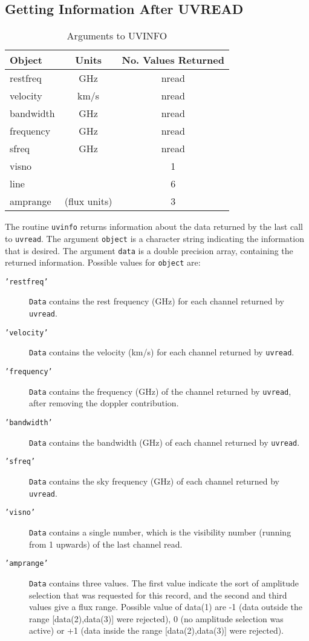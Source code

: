 \documentclass{report}
\begin{document}
\subsection{Getting Information After UVREAD}
\begin{table}\centering
\begin{tabular}{|l|c|c|}				    \hline
\bf Object	& \bf Units	& \bf No. Values Returned\\ \hline
restfreq	& GHz		& nread \\
velocity	& km/s		& nread \\
bandwidth	& GHz		& nread \\
frequency	& GHz		& nread \\
sfreq		& GHz		& nread \\
visno		&		& 1\\
line		&		& 6\\
amprange	& (flux units)	& 3\\			    \hline
\end{tabular}
\caption{Arguments to UVINFO}
\label{t:uvinfo}
\end{table}
The routine {\tt uvinfo} returns information about the data returned by
the last call to {\tt uvread}. The argument {\tt object} is a character
string indicating the information that is desired. The argument {\tt data}
is a double precision array, containing the returned information.
Possible values for {\tt object} are:
\begin{description}
\item[\texttt{'restfreq'}] {\tt Data} contains the rest frequency (GHz) for
each channel returned by {\tt uvread}.
\item[\texttt{'velocity'}] {\tt Data} contains the velocity (km/s) for each
channel returned by {\tt uvread}.
\item[\texttt{'frequency'}] {\tt Data} contains the frequency (GHz) of the
channel returned by {\tt uvread}, after removing the doppler contribution.
\item[\texttt{'bandwidth'}] {\tt Data} contains the bandwidth (GHz) of each
channel returned by {\tt uvread}.
\item[\texttt{'sfreq'}] {\tt Data} contains the sky frequency (GHz) of each
channel returned by {\tt uvread}.
\item[\texttt{'visno'}] {\tt Data} contains a single number, which is the
visibility number (running from 1 upwards) of the last channel read.
\item[\texttt{'amprange'}] {\tt Data} contains three values. The first value
indicate the sort of amplitude selection that was requested for this
record, and the second and third values give a flux range.
Possible value of data(1) are -1 (data outside the range [data(2),data(3)]
were rejected), 0 (no amplitude selection was active) or +1 (data inside the
range [data(2),data(3)] were rejected).
\end{description}
\end{document}
